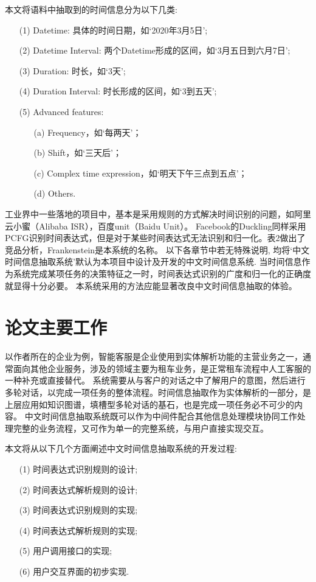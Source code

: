 本文将语料中抽取到的时间信息分为以下几类:
\begin{enumerate}
    \item[(1)]  Datetime: 具体的时间日期，如‘2020年3月5日’;
    \item[(2)]  Datetime Interval: 两个Datetime形成的区间，如‘3月五日到六月7日’;
    \item[(3)]  Duration: 时长，如‘3天’;
    \item[(4)]  Duration Interval: 时长形成的区间，如‘3到五天’;
    \item[(5)]  Advanced features:
        \begin{enumerate}
            \item[(a)]  Frequency，如‘每两天’；
            \item[(b)]   Shift，如‘三天后’；
            \item[(c)]  Complex time expression，如‘明天下午三点到五点’；
            \item[(d)] Others.
        \end{enumerate}
\end{enumerate}

工业界中一些落地的项目中，基本是采用规则的方式解决时间识别的问题，如阿里云小蜜（Alibaba ISR），百度unit（Baidu Unit）。
Facebook的Duckling同样采用PCFG识别时间表达式，但是对于某些时间表达式无法识别和归一化。表2做出了竞品分析，Frankenstein是本系统的名称。
以下各章节中若无特殊说明, 均将‘中文时间信息抽取系统’默认为本项目中设计及开发的中文时间信息系统.
当时间信息作为系统完成某项任务的决策特征之一时，时间表达式识别的广度和归一化的正确度就显得十分必要。
本系统采用的方法应能显著改良中文时间信息抽取的体验。


\section{论文主要工作}

以作者所在的企业为例，智能客服是企业使用到实体解析功能的主营业务之一，通常面向其他企业服务，涉及的领域主要为租车业务，是正常租车流程中人工客服的一种补充或直接替代。
系统需要从与客户的对话之中了解用户的意图，然后进行多轮对话，以完成一项任务的整体流程。时间信息抽取作为实体解析的一部分，是上层应用如知识图谱，填槽型多轮对话的基石，也是完成一项任务必不可少的内容。
中文时间信息抽取系统既可以作为中间件配合其他信息处理模块协同工作处理完整的业务流程，又可作为单一的完整系统，与用户直接实现交互。

本文将从以下几个方面阐述中文时间信息抽取系统的开发过程:
\begin{enumerate}
    \item[(1)] 时间表达式识别规则的设计;
    \item[(2)] 时间表达式解析规则的设计;
    \item[(3)] 时间表达式识别规则的实现;
    \item[(4)] 时间表达式解析规则的实现;
    \item[(5)] 用户调用接口的实现;
    \item[(6)] 用户交互界面的初步实现.
\end{enumerate}

